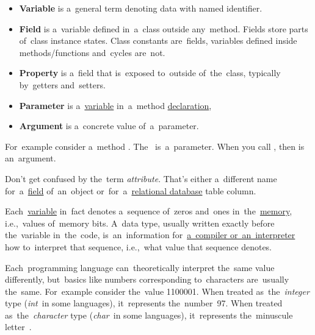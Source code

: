 \label{variablefieldproperty}
\begin{itemize}
    \item \textbf{Variable} is a~general term denoting data with named identifier.
    \item \textbf{Field} is a~variable defined in~a~class outside any~method.
          Fields store parts of~class instance states.
          Class constants are~fields, variables defined inside \mbox{methods/functions} and~cycles are~not.
    \item \textbf{Property} is a~field that is~exposed to~outside of~the~class, typically by~getters and~setters.
\end{itemize}
\newpage

\label{parameterargument}
\begin{itemize}
    \item \textbf{Parameter} is a~\hyperref[variablefieldproperty]{variable} in~a~method \hyperref[declarationdefinition]{declaration},
    \item \textbf{Argument} is a~concrete value of~a~parameter.
\end{itemize}
For~example consider a~method .
The~ is~a~parameter.
When you call , then  is an~argument.

\warning Don't get confused by the~term \textit{attribute}.
That's either a~different name for~a~\hyperref[variablefieldproperty]{field} of~an~object or~for~a~\hyperref[relationaldatabase]{relational database} table column.

\label{datatypes}
Each~\hyperref[variablefieldproperty]{variable} in~fact denotes a~sequence of~zeros and~ones in~the~\hyperref[systemmemory]{memory}, i.e.,~values of~memory bits.
A~data type, usually written exactly before the~variable in~the~code, is~an~information for~\hyperref[compiledinterpretedlanguages]{a~compiler or~an~interpreter} how to~interpret that sequence, i.e.,~what value that sequence denotes.

Each~programming language can~theoretically interpret the~same value differently, but~basics like numbers corresponding to~characters are~usually the~same.
For~example consider the~value 1100001.
When treated as~the~\textit{integer} type (\textit{int}~in some languages), it~represents the~number~97.
When treated as~the~\textit{character} type (\textit{char}~in some languages), it~represents the~minuscule letter~.

